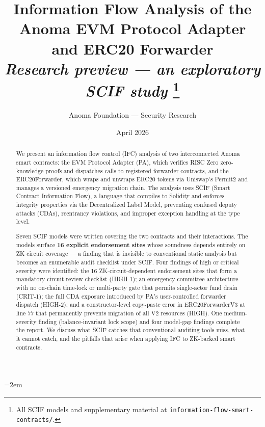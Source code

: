 \documentclass[11pt,a4paper]{article}
\title{%
  \textbf{Information Flow Analysis of the\\
  Anoma EVM Protocol Adapter and ERC20 Forwarder}\\[0.6em]
  {\large\normalfont\itshape Research preview --- an exploratory SCIF study}%
  \thanks{All SCIF models and supplementary material at
    \texttt{information-flow-smart-contracts/}.}
}
\author{Anoma Foundation --- Security Research}
\date{April 2026}
\begin{document}

\maketitle

\sloppy
\emergencystretch=2em

\begin{abstract}

We present an information flow control (IFC) analysis of two interconnected
Anoma smart contracts: the EVM Protocol Adapter (\textsf{PA}), which verifies
RISC Zero zero-knowledge proofs and dispatches calls to registered forwarder
contracts, and the \textsf{ERC20Forwarder}, which wraps and unwraps ERC20 tokens
via Uniswap's Permit2 and manages a versioned emergency migration chain.
The analysis uses SCIF (Smart Contract Information Flow), a language that
compiles to Solidity and enforces integrity properties via the Decentralized
Label Model, preventing confused deputy attacks (CDAs), reentrancy violations,
and improper exception handling at the type level.

Seven SCIF models were written covering the two contracts and their
interactions. The models surface \textbf{16 explicit endorsement sites}
whose soundness depends entirely on ZK circuit coverage --- a finding that
is invisible to conventional static analysis but becomes an enumerable audit
checklist under SCIF. Four findings of high or critical severity were
identified: the 16 ZK-circuit-dependent endorsement sites that form a
mandatory circuit-review checklist (HIGH-1); an emergency committee
architecture with no on-chain time-lock or multi-party gate that permits
single-actor fund drain (CRIT-1); the full CDA exposure introduced by
PA's user-controlled forwarder dispatch (HIGH-2); and a constructor-level
copy-paste error in \textsf{ERC20ForwarderV3} at line 77 that permanently
prevents migration of all V2 resources (HIGH). One medium-severity finding
(balance-invariant lock scope) and four model-gap findings complete the
report. We discuss what SCIF catches that conventional auditing tools miss,
what it cannot catch, and the pitfalls that arise when applying IFC to
ZK-backed smart contracts.

\end{abstract}
\end{document}
